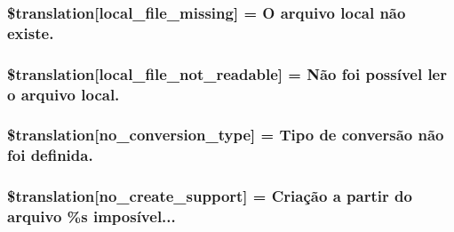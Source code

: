 \subsubsection[{\$translation}]{\setlength{\rightskip}{0pt plus 5cm}\$translation\mbox{[}\textquotesingle{}local\+\_\+file\+\_\+missing\textquotesingle{}\mbox{]} = \textquotesingle{}O arquivo local não existe.\textquotesingle{}}\label{class_8upload_8pt___b_r_8php_a6ec3d3a47ab70d77e7aa593e82ead10e}
\hypertarget{class_8upload_8pt___b_r_8php_a60104befef9b241f3a7a6a755618a4b3}{}
\subsubsection[{\$translation}]{\setlength{\rightskip}{0pt plus 5cm}\$translation\mbox{[}\textquotesingle{}local\+\_\+file\+\_\+not\+\_\+readable\textquotesingle{}\mbox{]} = \textquotesingle{}Não foi possível ler o arquivo local.\textquotesingle{}}\label{class_8upload_8pt___b_r_8php_a60104befef9b241f3a7a6a755618a4b3}
\hypertarget{class_8upload_8pt___b_r_8php_a4712d7ec28e9a7f17eb3338af2358363}{}
\subsubsection[{\$translation}]{\setlength{\rightskip}{0pt plus 5cm}\$translation\mbox{[}\textquotesingle{}no\+\_\+conversion\+\_\+type\textquotesingle{}\mbox{]} = \textquotesingle{}Tipo de conversão não foi definida.\textquotesingle{}}\label{class_8upload_8pt___b_r_8php_a4712d7ec28e9a7f17eb3338af2358363}
\hypertarget{class_8upload_8pt___b_r_8php_a346dfd1ade29f583dd20d345c436859f}{}
\subsubsection[{\$translation}]{\setlength{\rightskip}{0pt plus 5cm}\$translation\mbox{[}\textquotesingle{}no\+\_\+create\+\_\+support\textquotesingle{}\mbox{]} = \textquotesingle{}Criação a partir do arquivo \%s imposível...\textquotesingle{}}\label{class_8upload_8pt___b_r_8php_a346dfd1ade29f583dd20d345c436859f}
\hypertarget{class_8upload_8pt___b_r_8php_a191a55df8e3bb7f3c51b70f3c1932e02}{}
